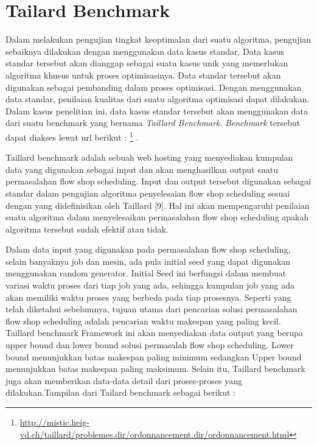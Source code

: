 \section{Tailard Benchmark}
Dalam melakukan pengujian tingkat keoptimalan dari suatu algoritma, pengujian sebaiknya dilakukan dengan menggunakan data kasus standar. Data kasus standar tersebut akan dianggap sebagai suatu kasus unik yang memerlukan algoritma khusus untuk proses optimisasinya. Data standar tersebut akan digunakan sebagai pembanding dalam proses optimisasi. 
Dengan menggunakan data	standar, penilaian kualitas dari suatu algoritma optimisasi dapat dilakukan. Dalam kasus penelitian ini, data kasus standar tersebut akan menggunakan data dari suatu benchmark yang bernama {\it Taillard Benchmark}. {\it Benchmark} tersebut dapat diakses lewat url berikut : \footnote{\label{Tailard}\url{http://mistic.heig-vd.ch/taillard/problemes.dir/ordonnancement.dir/ordonnancement.html} } .

Taillard benchmark adalah sebuah web hosting yang menyediakan kumpulan data yang digunakan sebagai input dan akan menghasilkan output suatu permasalahan flow shop scheduling. Input dan output tersebut digunakan sebagai standar dalam pengujian algoritma penyelesaian flow shop
scheduling sesuai dengan yang didefinisikan oleh Taillard [9]. Hal ini akan mempengaruhi penilaian suatu algoritma dalam menyelesaikan permasalahan flow shop scheduling apakah algoritma tersebut sudah efektif atau tidak.

Dalam data input yang digunakan pada permasalahan flow shop scheduling, selain banyaknya job dan mesin, ada pula initial seed yang dapat digunakan menggunakan random generator. Initial Seed ini berfungsi dalam membuat variasi waktu proses dari tiap job yang ada, sehingga kumpulan
job yang ada akan memiliki waktu proses yang berbeda pada tiap prosesnya. Seperti yang telah diketahui sebelumnya, tujuan utama dari pencarian solusi permasalahan flow shop scheduling adalah pencarian waktu makespan yang paling kecil. Taillard benchmark Framework
ini akan menyediakan data output yang berupa upper bound dan lower bound solusi permasalah
flow shop scheduling. Lower bound menunjukkan batas makespan paling minimum sedangkan Upper bound menunjukkan batas makespan paling maksimum. Selain itu, Taillard benchmark juga akan memberikan data-data detail dari proses-proses yang dilakukan.Tampilan dari Tailard benchmark sebagai berikut :

